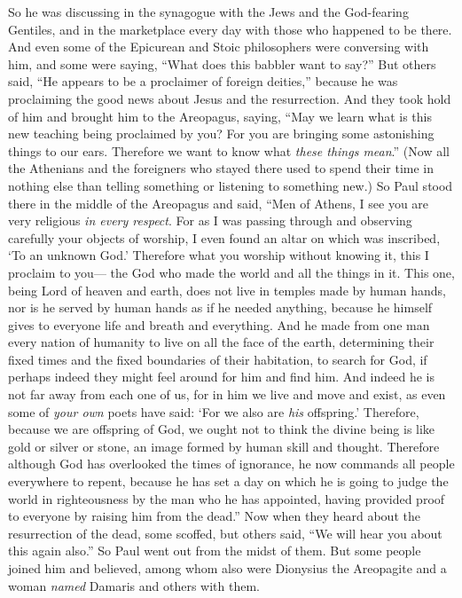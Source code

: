 \begin{biblechapter}
\verse So he was discussing in the synagogue with the Jews and the God-fearing Gentiles, and in the marketplace every day with those who happened to be there.
\verse And even some of the Epicurean and Stoic philosophers were conversing with him, and some were saying, “What does this babbler want to say?” But others said, “He appears to be a proclaimer of foreign deities,” because he was proclaiming the good news about Jesus and the resurrection.
\verse And they took hold of him and brought him to the Areopagus, saying, “May we learn what is this new teaching being proclaimed by you?
\verse For you are bringing some astonishing things to our ears. Therefore we want to know what \textit{these things mean}.”
\verse (Now all the Athenians and the foreigners who stayed there used to spend their time in nothing else than telling something or listening to something new.)
 So Paul stood there in the middle of the Areopagus and said, “Men of Athens, I see you are very religious \textit{in every respect}.
\verse For as I was passing through and observing carefully your objects of worship, I even found an altar on which was inscribed, ‘To an unknown God.’ Therefore what you worship without knowing it, this I proclaim to you—
\verse the God who made the world and all the things in it. This one, being Lord of heaven and earth, does not live in temples made by human hands,
\verse nor is he served by human hands as if he needed anything, because he himself gives to everyone life and breath and everything.
\verse And he made from one man every nation of humanity to live on all the face of the earth, determining their fixed times and the fixed boundaries of their habitation,
\verse to search for God, if perhaps indeed they might feel around for him and find him. And indeed he is not far away from each one of us,
\verse for in him we live and move and exist, as even some of \textit{your own} poets have said: ‘For we also are \textit{his} offspring.’
\verse Therefore, because we are offspring of God, we ought not to think the divine being is like gold or silver or stone, an image formed by human skill and thought.
\verse Therefore although God has overlooked the times of ignorance, he now commands all people everywhere to repent,
\verse because he has set a day on which he is going to judge the world in righteousness by the man who he has appointed, having provided proof to everyone by raising him from the dead.”
\verse Now when they heard about the resurrection of the dead, some scoffed, but others said, “We will hear you about this again also.”
\verse So Paul went out from the midst of them.
\verse But some people joined him and believed, among whom also were Dionysius the Areopagite and a woman \textit{named} Damaris and others with them.
\end{biblechapter}

